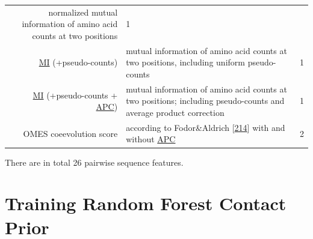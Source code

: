 \documentclass[11pt,a4paper,twoside]{book}
\theoremstyle{definition}
\theoremstyle{definition}
\theoremstyle{remark}
\begin{document}
\begin{longtable}[]{@{}rlc@{}}
\begin{minipage}[t]{0.50\columnwidth}
normalized mutual information of amino acid counts at two
positions\strut
\end{minipage} & \begin{minipage}[t]{0.18\columnwidth}\centering\strut
1\strut
\end{minipage}\tabularnewline
\begin{minipage}[t]{0.23\columnwidth}\raggedleft\strut
\protect\hyperlink{abbrev}{MI} (+pseudo-counts)\strut
\end{minipage} & \begin{minipage}[t]{0.50\columnwidth}\raggedright\strut
mutual information of amino acid counts at two positions, including
uniform pseudo-counts\strut
\end{minipage} & \begin{minipage}[t]{0.18\columnwidth}\centering\strut
1\strut
\end{minipage}\tabularnewline
\begin{minipage}[t]{0.23\columnwidth}\raggedleft\strut
\protect\hyperlink{abbrev}{MI} (+pseudo-counts +
\protect\hyperlink{abbrev}{APC})\strut
\end{minipage} & \begin{minipage}[t]{0.50\columnwidth}\raggedright\strut
mutual information of amino acid counts at two positions; including
pseudo-counts and average product correction\strut
\end{minipage} & \begin{minipage}[t]{0.18\columnwidth}\centering\strut
1\strut
\end{minipage}\tabularnewline
\begin{minipage}[t]{0.23\columnwidth}\raggedleft\strut
OMES coeevolution score\strut
\end{minipage} & \begin{minipage}[t]{0.50\columnwidth}\raggedright\strut
according to Fodor\&Aldrich
{[}\protect\hyperlink{ref-Fodor2004a}{214}{]} with and without
\protect\hyperlink{abbrev}{APC}\strut
\end{minipage} & \begin{minipage}[t]{0.18\columnwidth}\centering\strut
2\strut
\end{minipage}\tabularnewline
\bottomrule
\end{longtable}

There are in total 26 pairwise sequence features.

\section{Training Random Forest Contact Prior}\label{rf-training}
\end{document}
